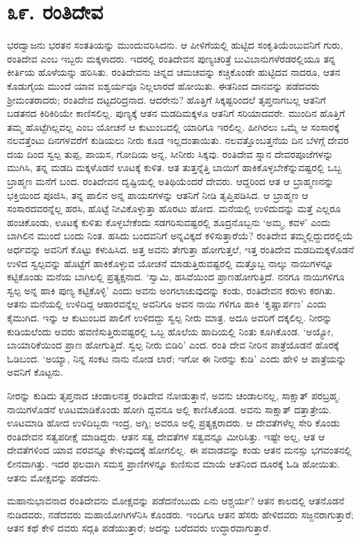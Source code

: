 
\chapter{೩೯. ರಂತಿದೇವ}

ಭರದ್ವಾಜನು ಭರತನ ಸಂತತಿಯನ್ನು ಮುಂದುವರಿಸಿದನು. ಆ ಪೀಳಿಗೆಯಲ್ಲಿ ಹುಟ್ಟಿದ ಸಂಕೃತಿಯೆಂಬುವನಿಗೆ ಗುರು, ರಂತಿದೇವ ಎಂಬ ಇಬ್ಬರು ಮಕ್ಕಳಾದರು. ಇದರಲ್ಲಿ ರಂತಿದೇವನ ಪುಣ್ಯಚರಿತ್ರೆ ಬುವಿಬಾನುಗಳೆರಡರಲ್ಲಿಯೂ ತನ್ನ ಕೀರ್ತಿಯ ಹೊಳೆಯನ್ನು ಹರಿಸಿತು. ರಂತಿದೇವನು ಚಿನ್ನದ ಚಮಚವನ್ನು ಕಚ್ಚಿಕೊಂಡೇ ಹುಟ್ಟಿದವ ನಾದರೂ, ಆತನ ಕೊಡುಗೈಯ ಮುಂದೆ ಯಾವ ಐಶ್ವರ್ಯವೂ ನಿಲ್ಲಲಾರದೆ ಹೋಯಿತು. ಈತನಿಂದ ದಾನವನ್ನು ಪಡೆದವರು ಶ್ರೀಮಂತರಾದರು; ರಂತಿದೇವ ದಟ್ಟದರಿದ್ರನಾದ. ಆದರೇನು? ಹೊತ್ತಿಗೆ ಸಿಕ್ಕಷ್ಟರಿಂದಲೆ ತೃಪ್ತನಾಗಬಲ್ಲ ಆತನಿಗೆ ಬಡತನದ ಕಿರಿಕಿರಿಯೇ ಕಾಣಿಸಲಿಲ್ಲ. ಪುಣ್ಯಕ್ಕೆ ಆತನ ಮಡದಿಮಕ್ಕಳೂ ಆತನಿಗೆ ಸರಿಯಾದವರೇ. ಮುಂದಿನ ಹೊತ್ತಿಗೆ ತಮ್ಮ ಹೊಟ್ಟೆಗಿಲ್ಲವಲ್ಲ ಎಂಬ ಯೋಚನೆ ಆ ಕುಟುಂಬದಲ್ಲಿ ಯಾರಿಗೂ ಇರಲಿಲ್ಲ. ಹೀಗಿರಲು ಒಮ್ಮೆ ಆ ಸಂಸಾರಕ್ಕೆ ನಲವತ್ತೆಂಟು ದಿನಗಳವರೆಗೆ ಕುಡಿಯಲು ನೀರು ಕೂಡ ಇಲ್ಲದಂತಾಯಿತು. ನಲವತ್ತೊಂಬತ್ತನೆಯ ದಿನ ಬೆಳಗ್ಗೆ ದೇವರ ದಯ ದಿಂದ ಸ್ವಲ್ಪ ತುಪ್ಪ, ಪಾಯಸ, ಗೋದಿಯ ಅನ್ನ, ಸೀನೀರು ಸಿಕ್ಕವು. ರಂತಿದೇವ ಸ್ನಾನ ದೇವರಪೂಜೆಗಳನ್ನು ಮುಗಿಸಿ, ತನ್ನ ಮಡದಿ ಮಕ್ಕಳೊಡನೆ ಊಟಕ್ಕೆ ಕುಳಿತ. ಆತ ತುತ್ತನ್ನೆತ್ತಿ ಬಾಯಿಗೆ ಹಾಕಿಕೊಳ್ಳಬೇಕೆನ್ನುವಷ್ಟರಲ್ಲಿ ಒಬ್ಬ ಬ್ರಾಹ್ಮಣ ಮನೆಗೆ ಬಂದ. ರಂತಿದೇವನ ದೃಷ್ಟಿಯಲ್ಲಿ ಅತಿಥಿಯೆಂದರೆ ದೇವರು. ಆದ್ದರಿಂದ ಆತ ಆ ಬ್ರಾಹ್ಮಣನನ್ನು ಭಕ್ತಿಯಿಂದ ಪೂಜಿಸಿ, ತನ್ನ ಪಾಲಿನ ಅನ್ನ ಪಾಯಸಗಳನ್ನು ಆತನಿಗೆ ನೀಡಿ ತೃಪ್ತಿಪಡಿಸಿದ. ಆ ಬ್ರಾಹ್ಮಣ ಆ ಸಂಸಾರದವರನ್ನೆಲ್ಲ ಹರಸಿ, ಹೊಟ್ಟೆ ನೀವಿಕೊಳ್ಳುತ್ತಾ ಹೊರಟು ಹೋದ. ಮನೆಯಲ್ಲಿ ಉಳಿದುದನ್ನು ಮತ್ತೆ ಎಲ್ಲರೂ ಹಂಚಿಕೊಂಡು, ಊಟಕ್ಕೆ ಕುಳಿತು ಕೊಳ್ಳಬೇಕೆಂದು ಸಡಗರಿಸುವಷ್ಟರಲ್ಲಿ ಶೂದ್ರನೊಬ್ಬನು ‘ಅಮ್ಮ, ಕವಳ’ ಎಂದು ಬಾಗಿಲಿನ ಮುಂದೆ ಬಂದು ನಿಂತ. ಹಸಿದು ಬಂದವನಿಗೆ ಅನ್ನವಿಕ್ಕದೆ ಕಳಿಸುತ್ತಾರೆಯೆ? ರಂತಿದೇವ ತಮ್ಮಲ್ಲಿದ್ದುದರಲ್ಲಿಯೆ ಅರ್ಧವನ್ನು ಅವನಿಗೆ ಕೊಟ್ಟು ಕಳುಹಿಸಿದ. ಅತ್ತ ಅವನು ತೇಗುತ್ತಾ ಹೋಗುತ್ತಲೆ, ಇತ್ತ ರಂತಿದೇವ ಮಡದಿಮಕ್ಕಳೊಡನೆ ಉಳಿದ ಸ್ವಲ್ಪವನ್ನು ಹೊಟ್ಟೆಗೆ ಹಾಕಿಕೊಳ್ಳುವ ಯೋಚನೆ ಮಾಡುತ್ತಿರುವಷ್ಟರಲ್ಲಿ ಮತ್ತೊಬ್ಬ ನಾಲ್ಕು ನಾಯಿಗಳನ್ನೂ ಕಟ್ಟಿಕೊಂಡು ಮನೆಯ ಬಾಗಿಲಲ್ಲಿ ಪ್ರತ್ಯಕ್ಷನಾದ. ‘ಸ್ವಾಮಿ, ಹಸಿವೆಯಿಂದ ಪ್ರಾಣಹೋಗುತ್ತಿದೆ. ನನಗೂ ನಾಯಿಗಳಿಗೂ ಸ್ವಲ್ಪ ಅನ್ನ ಹಾಕಿ ಪುಣ್ಯ ಕಟ್ಟಿಕೊಳ್ಳಿ’ ಎಂದು ಅವನು ಅಂಗಲಾಚುವುದನ್ನು ಕಂಡು, ರಂತಿದೇವನ ಕರುಳು ಕರಗಿತು. ಆತನು ಮನೆಯಲ್ಲಿ ಉಳಿದಿದ್ದ ಆಹಾರವನ್ನೆಲ್ಲ ಅವನಿಗೂ ಅವನ ನಾಯಿ ಗಳಿಗೂ ಹಾಕಿ ‘ಕೃಷ್ಣಾರ್ಪಣ’ ಎಂದು ಕೈಮುಗಿದ. ಇನ್ನು ಆ ಕುಟುಂಬದ ಪಾಲಿಗೆ ಉಳಿದದ್ದು ಸ್ವಲ್ಪ ನೀರು ಮಾತ್ರ. ಅದೂ ಅವರಿಗೆ ದಕ್ಕಲಿಲ್ಲ. ನೀರನ್ನು ಕುಡಿಯಲೆಂದು ಅವರು ಹವಣಿಸುತ್ತಿರುವಷ್ಟರಲ್ಲಿ ಒಬ್ಬ ಹೊಲೆಯ ಹಾದಿಯಲ್ಲಿ ನಿಂತು ಕೂಗಿಕೊಂಡ. ‘ಅಯ್ಯೋ, ಬಾಯಾರಿಕೆಯಿಂದ ಪ್ರಾಣ ಹೋಗುತ್ತಿದೆ. ಸ್ವಲ್ಪ ನೀರು ಬಿಡಿರಿ’ ಎಂದ. ರಂತಿ ದೇವ ನೀರಿನ ಪಾತ್ರೆಯೊಡನೆ ಹೊರಕ್ಕೆ ಓಡಿಬಂದ. ‘ಅಯ್ಯಾ, ನಿನ್ನ ಸಂಕಟ ನಾನು ನೋಡ ಲಾರೆ; ಇಗೋ ಈ ನೀರನ್ನು ಕುಡಿ’ ಎಂದು ಹೇಳಿ ಆ ಪಾತ್ರೆಯನ್ನು ಅವನಿಗೆ ಕೊಟ್ಟನು.

ನೀರನ್ನು ಕುಡಿದು ತೃಪ್ತನಾದ ಚಂಡಾಲನತ್ತ ರಂತಿದೇವ ನೋಡುತ್ತಾನೆ, ಅವನು ಚಂಡಾಲನಲ್ಲ, ಸಾಕ್ಷಾತ್ ಪರಬ್ರಹ್ಮ. ನಾಯಿಗಳೊಡನೆ ಊಟಮಾಡಿಕೊಂಡು ಹೋಗಿ ದ್ದವನೂ ಅಲ್ಲಿ ಕಾಣಿಸಿಕೊಂಡ. ಅವನು ಸಾಕ್ಷಾತ್ ದತ್ತಾತ್ರೇಯ. ಊಟಮಾಡಿ ಹೋದ ಉಳಿದಿಬ್ಬರು ಇಂದ್ರ, ಅಗ್ನಿ; ಅವರೂ ಅಲ್ಲಿ ಪ್ರತ್ಯಕ್ಷರಾದರು. ಆ ದೇವತೆಗಳೆಲ್ಲ ಸೇರಿ ಕೊಂಡು ರಂತಿದೇವನ ಸತ್ವಪರೀಕ್ಷೆ ಮಾಡಿದ್ದರು. ಆತನ ಸತ್ವ ದೇವತೆಗಳ ಸತ್ವವನ್ನೂ ಮೀರಿಸಿತ್ತು. ಇಷ್ಟೇ ಅಲ್ಲ, ಆತ ಆ ದೇವತೆಗಳಿಂದ ಯಾವ ವರವನ್ನೂ ಕೇಳುವುದಕ್ಕೆ ಹೋಗಲಿಲ್ಲ. ಈ ಪವಾಡವನ್ನು ಕಂಡು ಆತನ ಮನಸ್ಸು ಭಗವಂತನಲ್ಲಿ ಲೀನವಾಗಿತ್ತು. ಇದರ ಫಲವಾಗಿ ಸಮಸ್ತ ಪ್ರಾಣಿಗಳನ್ನೂ ಕುಣಿಸುವ ಮಾಯೆ ಆತನಿಂದ ದೂರಕ್ಕೆ ಓಡಿ ಹೋಯಿತು. ಆತನು ಮೋಕ್ಷವನ್ನು ಪಡೆದನು.

ಮಹಾನುಭಾವನಾದ ರಂತಿದೇವನು ಮೋಕ್ಷವನ್ನು ಪಡೆದನೆಂಬುದು ಏನು ಆಶ್ಚರ್ಯ? ಆತನ ಕಾಲದಲ್ಲಿ ಆತನೊಡನೆ ನುಡಿದವರು, ನಡೆದವರು ಮಹಾಯೋಗಿಗಳೆನಿಸಿ ಕೊಂಡರು. ಇಂದಿಗೂ ಆತನ ಹೆಸರು ಹೇಳಿದವರು ಸಜ್ಜನರಾಗುತ್ತಾರೆ; ಆತನ ಕಥೆ ಕೇಳಿ ದವರು ಸದ್ಗತಿ ಪಡೆಯುತ್ತಾರೆ; ಅದನ್ನು ಬರೆದವರು ಉದ್ಧಾರವಾಗುತ್ತಾರೆ.

